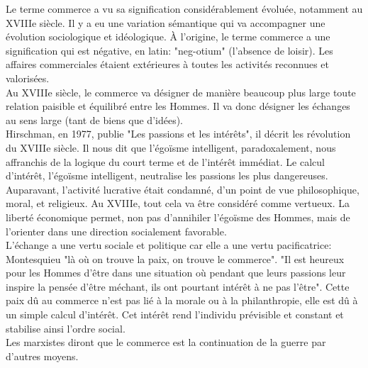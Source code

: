 \documentclass[10pt, a4paper, openany]{book}
\begin{document}
Le terme commerce a vu sa signification considérablement évoluée, notamment au XVIIIe siècle. Il y a eu une variation sémantique qui va accompagner une évolution sociologique et idéologique. À l'origine, le terme commerce a une signification qui est négative, en latin: "neg-otium" (l'absence de loisir). Les affaires commerciales étaient extérieures à toutes les activités reconnues et valorisées. \\
Au XVIIIe siècle, le commerce va désigner de manière beaucoup plus large toute relation paisible et équilibré entre les Hommes. Il va donc désigner les échanges au sens large (tant de biens que d'idées). \\
Hirschman, en 1977, publie "Les passions et les intérêts", il décrit les révolution du XVIIIe siècle. Il nous dit que l'égoïsme intelligent, paradoxalement, nous affranchis de la logique du court terme et de l'intérêt immédiat. Le calcul d'intérêt, l'égoïsme intelligent, neutralise les passions les plus dangereuses. Auparavant, l'activité lucrative était condamné, d'un point de vue philosophique, moral, et religieux. Au XVIIIe, tout cela va être considéré comme vertueux. La liberté économique permet, non pas d'annihiler l'égoïsme des Hommes, mais de l'orienter dans une direction socialement favorable. \\
L'échange a une vertu sociale et politique car elle a une vertu pacificatrice: Montesquieu "là où on trouve la paix, on trouve le commerce". "Il est heureux pour les Hommes d'être dans une situation où pendant que leurs passions leur inspire la pensée d'être méchant, ils ont pourtant intérêt à ne pas l'être". Cette paix dû au commerce n'est pas lié à la morale ou à la philanthropie, elle est dû à un simple calcul d'intérêt. Cet intérêt rend l'individu prévisible et constant et stabilise ainsi l'ordre social. \\
Les marxistes diront que le commerce est la continuation de la guerre par d'autres moyens. 
\end{document}
